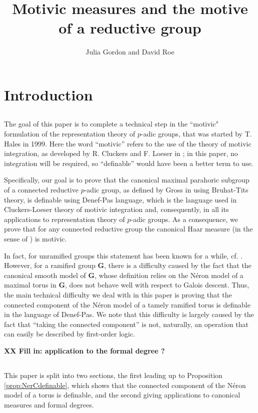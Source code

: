 \documentclass{amsart}
\title[]{Motivic measures and the motive of a reductive group}
\author{Julia Gordon and David Roe}
\newcommand{\bG}{\mathbf{G}}
\theoremstyle{plain}
\theoremstyle{definition}
\begin{document}
\maketitle

\section{Introduction}
\subsection{}
The goal of this paper is to complete a technical step in the 
``motivic" formulation of 
the representation theory of $p$-adic groups, that was started by T. Hales in 1999. 
Here  the word ``motivic'' refers to the use of the theory of motivic integration, as developed by R. Cluckers and F. Loeser in \cite{cluckers-loeser}; in this paper, no integration will be required, so ``definable'' would have been a better term to use. 

Specifically, our goal is to prove that the canonical maximal parahoric subgroup of a connected reductive $p$-adic group, as defined by Gross in \cite{gross:motive} using Bruhat-Tits theory, is definable using Denef-Pas language, which is the language used in Cluckers-Loeser theory of motivic integration and, consequently,  in all its applications to representation theory of $p$-adic groups. As a consequence, we  prove that for any connected reductive group the canonical Haar measure (in the sense of \cite{gross:motive}) is motivic.

In fact, for unramified groups this statement has been known for a while, cf. \cite{cluckers-hales-loeser}. However, for a ramified group $\bG$, there is a difficulty caused by the fact that the canonical smooth model of $\bG$, whose definition relies on the N\'eron model of a maximal torus in $\bG$, does not behave well with respect to Galois descent. Thus, the main technical difficulty we deal with in this paper is proving that the connected component of the N\'eron model of a tamely ramified torus is definable in the language of Denef-Pas. We note that this difficulty is largely caused by the fact that ``taking the connected component'' is not, naturally, an operation that can easily be described by first-order logic. 

{\bf XX Fill in: application to the formal degree ?}

\subsection{}This paper is split into two sections, the first leading up to Proposition \ref{prop:NerCdefinable},
which shows that the connected component of the N\'eron model of a torus is definable,
and the second giving applications to canonical measures and formal degrees.
\end{document}
